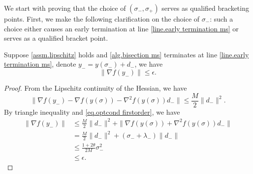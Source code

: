 \documentclass{article}
\begin{document}
We start with proving that the choice of $(\sigma_-,\sigma_+)$ serves as qualified bracketing points. First, we make the following clarification on the choice of $\sigma_-$: such a choice either causes an early termination at line \ref{line.early termination ms} or serves as a qualified bracket point.
\begin{lemma}
    \label{lem.early termination ms}
    Suppose \autoref{assm.lipschitz} holds and \autoref{alg.bisection ms} terminates at line \ref{line.early termination ms}, denote $y_- = y(\sigma_-)+d_-$, we have
    \begin{equation*}
        \|\nabla f(y_-) \|\leq \epsilon.
    \end{equation*}
\end{lemma}
\begin{proof}
    From the Lipschitz continuity of the Hessian, we have
    \begin{equation*}
        \|\nabla f(y_-)-\nabla f(y(\sigma))-\nabla^2 f(y(\sigma))d_-\|\leq \frac{M}{2}\|d_-\|^2.
    \end{equation*}
    By triangle inequality and \eqref{eq.optcond firstorder}, we have
    \begin{equation*}
        \begin{aligned}
            \|\nabla f(y_-)\| &\leq \frac{M}{2}\|d_-\|^2+\| \nabla f(y(\sigma))+\nabla^2 f(y(\sigma))d_-\|\\ 
            &= \frac{M}{2}\|d_-\|^2+(\sigma_-+\lambda_-) \|d_-\|\\
            &\leq \frac{1+2\theta}{2M}\sigma_-^2\\
            &\leq \epsilon.
        \end{aligned}
    \end{equation*}
\end{proof}
\end{document}

